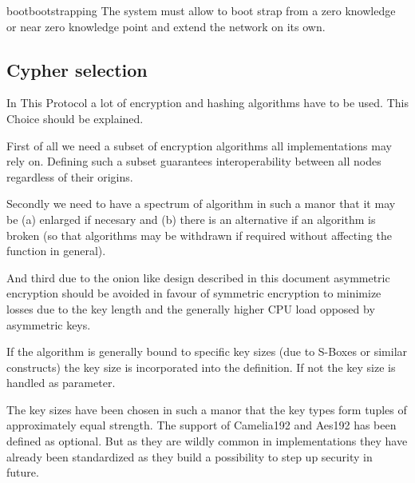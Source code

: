 \begin{requirement}{boot}{bootstrapping}
	The system must allow to boot strap from a zero knowledge or near zero knowledge point and extend the network on its own. 
\end{requirement}

\subsection{Cypher selection}
In This Protocol a lot of encryption and hashing algorithms have to be used. This Choice should be explained. 

First of all we need a subset of encryption algorithms all implementations may rely on. Defining such a subset guarantees interoperability between all nodes regardless of their origins. 

Secondly we need to have a spectrum of algorithm in such a manor that it may be (a) enlarged if necesary and (b) there is an alternative if an algorithm is broken (so that algorithms may be withdrawn if required without affecting the function in general). 

And third due to the onion like design described in this document asymmetric encryption should be avoided in favour of symmetric encryption to minimize losses due to the key length and the generally higher CPU load opposed by asymmetric keys.

If the algorithm is generally bound to specific key sizes (due to S-Boxes or similar constructs) the key size is incorporated into the definition. If not the key size is handled as parameter.

The key sizes have been chosen in such a manor that the key types form tuples of approximately equal strength. The support of Camelia192 and Aes192 has been defined as optional. But as they are wildly common in implementations they have already been standardized as they  build a possibility to step up security in future.

